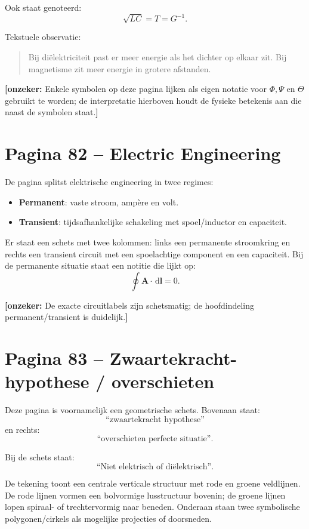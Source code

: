 \documentclass[11pt,a4paper]{article}
\newcommand{\onzeker}[1]{\ifmmode\text{\color{red!70!black}\bfseries[onzeker]}\else\textcolor{red!70!black}{\textbf{[onzeker:} #1\textbf{]}}\fi}
\newcommand{\vect}[1]{\mathbf{#1}}
\newcommand{\dd}{\,\mathrm{d}}
\begin{document}
Ook staat genoteerd:
\[
\sqrt{LC}=T=G^{-1}.
\]

Tekstuele observatie:
\begin{quote}
Bij diëlektriciteit past er meer energie als het dichter op elkaar zit.
Bij magnetisme zit meer energie in grotere afstanden.
\end{quote}

\onzeker{Enkele symbolen op deze pagina lijken als eigen notatie voor $\Phi,\Psi$ en $\Theta$ gebruikt te worden; de interpretatie hierboven houdt de fysieke betekenis aan die naast de symbolen staat.}

\section*{Pagina 82 -- Electric Engineering}

De pagina splitst elektrische engineering in twee regimes:

\begin{itemize}
    \item \textbf{Permanent}: vaste stroom, ampère en volt.
    \item \textbf{Transient}: tijdsafhankelijke schakeling met spoel/inductor en capaciteit.
\end{itemize}

Er staat een schets met twee kolommen: links een permanente stroomkring en rechts een transient circuit met een spoelachtige component en een capaciteit. Bij de permanente situatie staat een notitie die lijkt op:
\[
\oint \vect{A}\cdot\dd\vect{l}=0.
\]

\onzeker{De exacte circuitlabels zijn schetsmatig; de hoofdindeling permanent/transient is duidelijk.}

\section*{Pagina 83 -- Zwaartekracht-hypothese / overschieten}

Deze pagina is voornamelijk een geometrische schets. Bovenaan staat:
\[
\text{``zwaartekracht hypothese''}
\]
en rechts:
\[
\text{``overschieten perfecte situatie''}.
\]

Bij de schets staat:
\[
\text{``Niet elektrisch of diëlektrisch''}.
\]

De tekening toont een centrale verticale structuur met rode en groene veldlijnen. De rode lijnen vormen een bolvormige lusstructuur bovenin; de groene lijnen lopen spiraal- of trechtervormig naar beneden. Onderaan staan twee symbolische polygonen/cirkels als mogelijke projecties of doorsneden.
\end{document}
